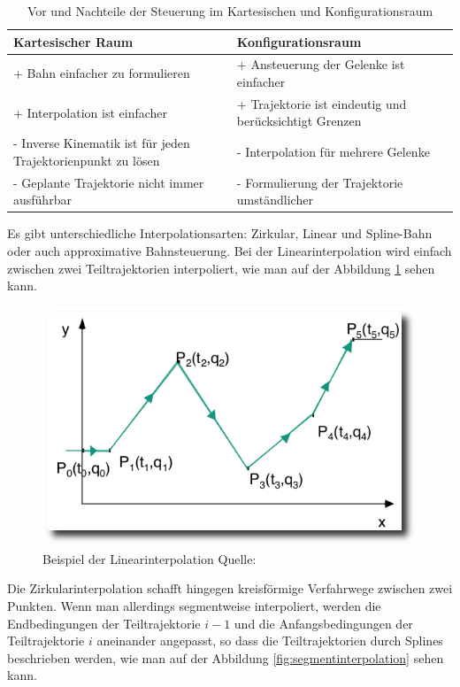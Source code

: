 \begin{table}[h]
		\centering
		\begin{tabular}{| p{7cm} | p{7cm}|}
\hline
\textbf{Kartesischer Raum} & \textbf{Konfigurationsraum}\\
\hline
+ Bahn einfacher zu formulieren & + Ansteuerung der Gelenke ist
einfacher\\
+ Interpolation ist einfacher & + Trajektorie ist eindeutig und
berücksichtigt Grenzen\\

- Inverse Kinematik ist für jeden Trajektorienpunkt zu lösen & - Interpolation für mehrere
Gelenke\\
- Geplante Trajektorie nicht immer ausführbar & - Formulierung der Trajektorie umständlicher\\
\hline
		\end{tabular}
		\caption{\label{fig:steurungProContra} Vor und Nachteile der Steuerung im Kartesischen und Konfigurationsraum \citep{rob1}}
		\end{table}	
Es gibt unterschiedliche Interpolationsarten:
Zirkular, Linear und Spline-Bahn oder auch approximative Bahnsteuerung.
Bei der Linearinterpolation wird einfach zwischen zwei Teiltrajektorien interpoliert, wie man auf der Abbildung \ref{fig:linearinterpolation} sehen kann.
\begin{figure}[h]
	\center
	\includegraphics[scale=0.35]{graphics/linearinterpolation.png}
	\caption{\label{fig:linearinterpolation} Beispiel der Linearinterpolation Quelle: \citep{rob1}}
\end{figure}
Die Zirkularinterpolation schafft hingegen kreisförmige Verfahrwege zwischen zwei Punkten.
Wenn man allerdings segmentweise interpoliert, werden die Endbedingungen der Teiltrajektorie $i-1$ und die Anfangsbedingungen der Teiltrajektorie $i$ aneinander angepasst, so dass die Teiltrajektorien durch Splines beschrieben werden, wie man auf der Abbildung \ref{fig:segmentinterpolation} sehen kann.
